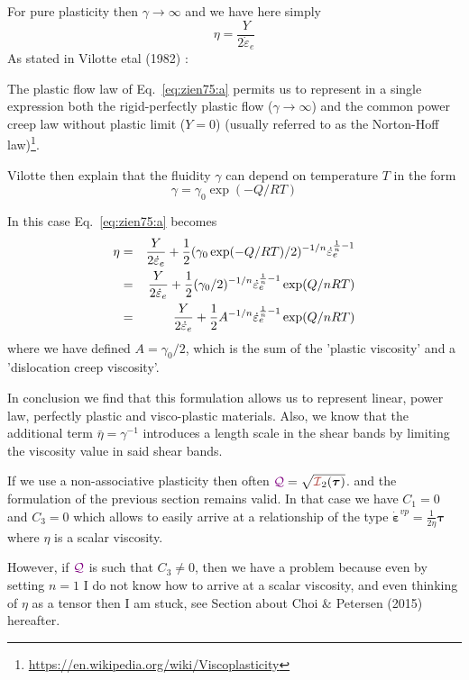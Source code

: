 For pure plasticity then $\gamma \rightarrow \infty$ and we have here simply
\[
\eta = \frac{Y}{2  \dot\varepsilon_e}
\]
As stated in Vilotte etal (1982) \cite{vidm82}: 
\begin{displayquote}
{\color{darkgray}
The plastic flow law of Eq.~\eqref{eq:zien75:a} permits us to
represent in a single expression both the rigid-perfectly plastic flow
($\gamma\rightarrow \infty$)
and the common power creep law without plastic limit ($Y=0$)
(usually referred to as the Norton-Hoff law)\footnote{\url{https://en.wikipedia.org/wiki/Viscoplasticity}}.}
\end{displayquote}
Vilotte \cite{vidm82} then explain that the fluidity $\gamma$ can depend on temperature $T$ in the form 
\[
\gamma = \gamma_0 \exp(-Q/RT)
\]

In this case Eq.~\eqref{eq:zien75:a} becomes
\begin{eqnarray}
\eta 
&=& \frac{ Y }{2  \dot\varepsilon_e} + \frac{1 }{2 } ( \gamma_0 \exp(-Q/RT) /2)^{-1/n}  \dot\varepsilon_e^{\frac1n-1}  \nonumber\\
&=& \frac{ Y }{2  \dot\varepsilon_e} + \frac{1 }{2 } ( \gamma_0 /2)^{-1/n}  \dot\varepsilon_e^{\frac1n-1}  \exp(Q/nRT) \nonumber\\
&=& \frac{ Y }{2  \dot\varepsilon_e} + \frac{1 }{2 } A^{-1/n}  \dot\varepsilon_e^{\frac1n-1}  \exp(Q/nRT) 
\end{eqnarray}
where we have defined $A=\gamma_0/2$,
which is the sum of the 'plastic viscosity' and a 'dislocation creep viscosity'.

In conclusion we find that this formulation allows us to represent linear, power law,
perfectly plastic and visco-plastic materials.
Also, we know that the additional term $\bar\eta=\gamma^{-1}$ introduces a length scale
in the shear bands by limiting the viscosity value in said shear bands.


\begin{remark}
If we use a non-associative plasticity then often $\QQQ=\sqrt{{\III}_2(\bm\tau)}$.
and the formulation of the previous section remains valid. In that case 
we have $C_1=0$ and $C_3=0$ which allows to easily arrive at a relationship 
of the type $\dot{\bm\varepsilon}^{vp} = \frac{1}{2\eta} \bm\tau$ where 
$\eta$ is a scalar viscosity. 

However, if ${\color{violet}\cal Q}$ is such that $C_3\neq 0$, then we have a problem because 
even by setting $n=1$ I do not know how to arrive at a scalar viscosity, 
and even thinking of $\eta$ as a tensor then I am stuck, see Section about 
Choi \& Petersen (2015) hereafter.
\end{remark}


